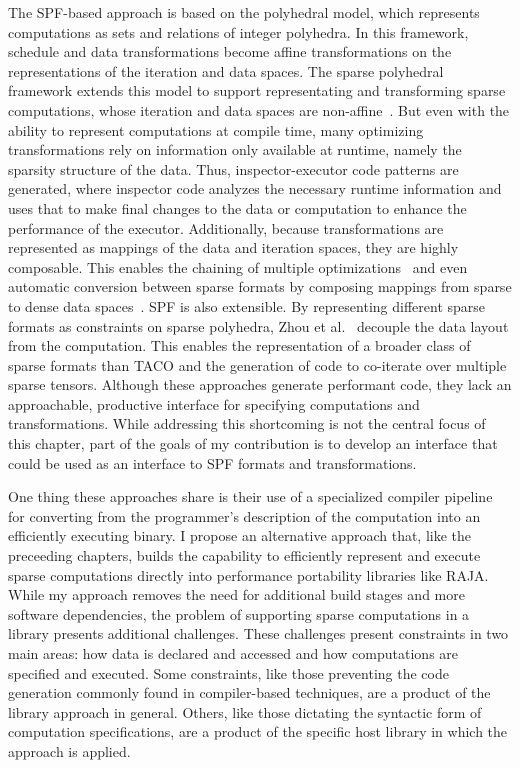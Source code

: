 The SPF-based approach is based on the polyhedral model, which represents computations as sets and relations of integer polyhedra. 
In this framework, schedule and data transformations become affine transformations on the representations of the iteration and data spaces.
The sparse polyhedral framework extends this model to support representating and transforming sparse computations, whose iteration and data spaces are non-affine~\cite{strout2016approach}. 
But even with the ability to represent computations at compile time, many optimizing transformations rely on information only available at runtime, namely the sparsity structure of the data.
Thus, inspector-executor code patterns are generated, where inspector code analyzes the necessary runtime information and uses that to make final changes to the data or computation to enhance the performance of the executor.
Additionally, because transformations are represented as mappings of the data and iteration spaces, they are highly composable. This enables the chaining of multiple optimizations~\cite{ahmad2017optimizing} and even automatic conversion between sparse formats by composing mappings from sparse to dense data spaces~\cite{popoola2023code}. 
SPF is also extensible. By representing different sparse formats as constraints on sparse polyhedra, Zhou et al.~\cite{zhao2022polyhedral} decouple the data layout from the computation. 
This enables the representation of a broader class of sparse formats than TACO and the generation of code to co-iterate over multiple sparse tensors.
Although these approaches generate performant code, they lack an approachable, productive interface for specifying computations and transformations. 
While addressing this shortcoming is not the central focus of this chapter, part of the goals of my contribution is to develop an interface that could be used as an interface to SPF formats and transformations.

One thing these approaches share is their use of a specialized compiler pipeline for converting from the programmer's description of the computation into an efficiently executing binary. 
I propose an alternative approach that, like the preceeding chapters, builds the capability to efficiently represent and execute sparse computations directly into performance portability libraries like RAJA. 
While my approach removes the need for additional build stages and more software dependencies, the problem of supporting sparse computations in a library presents additional challenges.
These challenges present constraints in two main areas: how data is declared and accessed and how computations are specified and executed. 
Some constraints, like those preventing the code generation commonly found in compiler-based techniques, are a product of the library approach in general.
Others, like those dictating the syntactic form of computation specifications, are a product of the specific host library in which the approach is applied.






